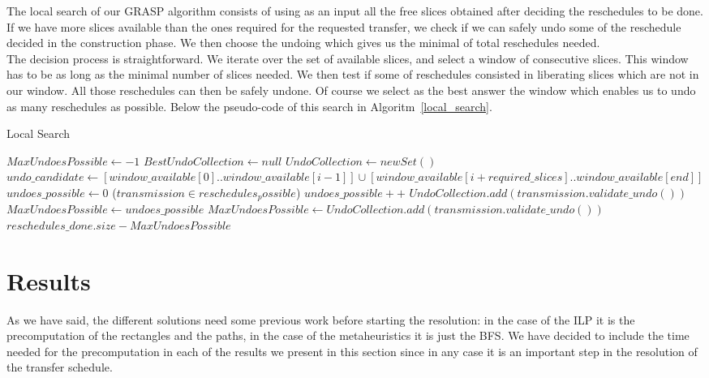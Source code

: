 \documentclass[11pt,a4paper]{article}
\begin{document}
The local search of our GRASP algorithm consists of using as an input all the free slices obtained after deciding the reschedules to be done. If we have more slices available than the ones required for the requested transfer, we check if we can safely undo some of the reschedule decided in the construction phase. We then choose the undoing which gives us the minimal of total reschedules needed.\\

The decision process is straightforward. We iterate over the set of available slices, and select a window of consecutive slices. This window has to be as long as the minimal number of slices needed. We then test if some of reschedules consisted in liberating slices which are not in our window. All those reschedules can then be safely undone. Of course we select as the best answer the window which enables us to undo as many reschedules as possible. Below the pseudo-code of this search in Algoritm~\ref{local_search}.\\ 

\begin{algorithm}[H]
\caption{Local Search}\label{local_search}
\begin{algorithmic}[1]
	\State $MaxUndoesPossible \gets -1$
	\State $BestUndoCollection \gets null$
		\State $UndoCollection \gets new Set()$
		\State $undo\_candidate \gets [window\_available[0]..window\_available[i-1]] \cup [window\_available[i+required\_slices]..window\_available[end]]$
		\State $undoes\_possible\gets 0$
		\ForAll($transmission \in reschedules_possible$)
				\State $undoes\_possible++$
				\State $UndoCollection.add(transmission.validate\_undo())$
			\EndIf
		\EndFor
			\State $MaxUndoesPossible \gets undoes\_possible$
			\State $MaxUndoesPossible \gets UndoCollection.add		(transmission.validate\_undo())$
		\EndIf
	\EndFor
	\State \Return $reschedules\_done.size - MaxUndoesPossible$
\EndProcedure
\end{algorithmic}
\end{algorithm}

\section{Results}
As we have said, the different solutions need some previous work before starting the resolution: in the case of the ILP it is the precomputation of the rectangles and the paths, in the case of the metaheuristics it is just the BFS. We have decided to include the time needed for the precomputation in each of the results we present in this section since in any case it is an important step in the resolution of the transfer schedule.
\end{document}
